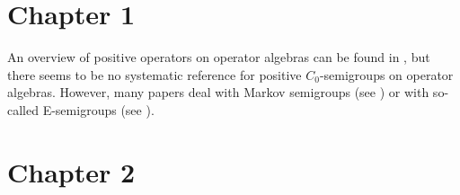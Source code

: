 \setcounter{section}{0}
\notesheaderfour
\thispagestyle{empty}
\section*{Chapter 1}
An overview of positive operators on operator algebras can be found in \textcite{zbmath06128372}, but there seems to be no systematic reference for positive $C_{0}$-semigroups on operator algebras.
However, many papers deal with Markov semigroups (see \eg \textcite{zbmath03762672}) or with so-called E-semigroups (see \textcite{zbmath01949821}).
\section*{Chapter 2}
